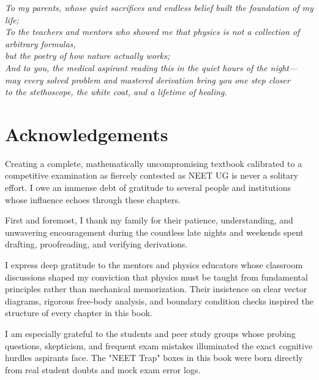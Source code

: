 \documentclass[10pt,twoside,openright]{book}
\begin{document}
\thispagestyle{empty}
\vspace*{5cm}
\begin{center}
  \itshape\large
  To my parents, whose quiet sacrifices and endless belief built the foundation of my life;\\
  \vspace{1.2cm}
  To the teachers and mentors who showed me that physics is not a collection of arbitrary formulas,\\
  but the poetry of how nature actually works;\\
  \vspace{1.2cm}
  And to you, the medical aspirant reading this in the quiet hours of the night---\\
  may every solved problem and mastered derivation bring you one step closer\\
  to the stethoscope, the white coat, and a lifetime of healing.
\end{center}
\cleardoublepage

\chapter*{Acknowledgements}

Creating a complete, mathematically uncompromising textbook calibrated to a competitive examination as fiercely contested as NEET UG is never a solitary effort. I owe an immense debt of gratitude to several people and institutions whose influence echoes through these chapters.

First and foremost, I thank my family for their patience, understanding, and unwavering encouragement during the countless late nights and weekends spent drafting, proofreading, and verifying derivations.

I express deep gratitude to the mentors and physics educators whose classroom discussions shaped my conviction that physics must be taught from fundamental principles rather than mechanical memorization. Their insistence on clear vector diagrams, rigorous free-body analysis, and boundary condition checks inspired the structure of every chapter in this book.

I am especially grateful to the students and peer study groups whose probing questions, skepticism, and frequent exam mistakes illuminated the exact cognitive hurdles aspirants face. The "NEET Trap" boxes in this book were born directly from real student doubts and mock exam error logs.
\end{document}
